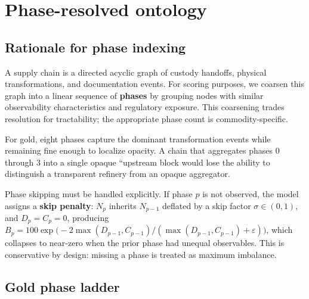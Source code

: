 \documentclass[12pt]{article}
\theoremstyle{remark}
\begin{document}
\section{Phase-resolved ontology}\label{sec:ontology}

\subsection{Rationale for phase indexing}

A supply chain is a directed acyclic graph of custody handoffs, physical transformations,
and documentation events.  For scoring purposes, we coarsen this graph into a linear
sequence of \textbf{phases} by grouping nodes with similar observability characteristics
and regulatory exposure.  This coarsening trades resolution for tractability; the
appropriate phase count is commodity-specific.

For gold, eight phases capture the dominant transformation events while remaining fine
enough to localize opacity.  A chain that aggregates phases 0 through 3 into a single
opaque ``upstream block would lose the ability to distinguish a transparent refinery
from an opaque aggregator.

Phase skipping must be handled explicitly.  If phase $p$ is not observed, the model
assigns a \textbf{skip penalty}: $N_p$ inherits $N_{p-1}$ deflated by a skip factor
$\sigma \in (0,1)$, and $D_p = C_p = 0$, producing
$B_p = 100\exp\bigl(-2\max(D_{p-1},C_{p-1})/(\max(D_{p-1},C_{p-1})+\varepsilon)\bigr)$,
which collapses to near-zero when the prior phase had unequal observables.  This is
conservative by design: missing a phase is treated as maximum imbalance.

\subsection{Gold phase ladder}\label{subsec:gold-phases}
\end{document}
